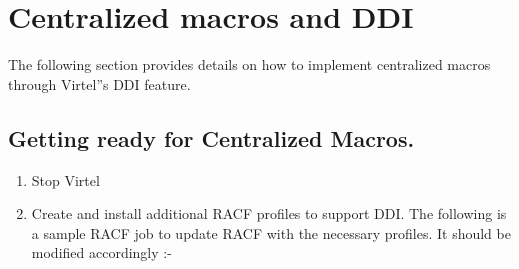 \documentclass[letterpaper,10pt,english]{sphinxmanual}
\begin{document}
\begin{sphinxVerbatim}[commandchars=\\\{\}]

  
          
   
\end{sphinxVerbatim}


\chapter{Centralized macros and DDI}
\label{\detokenize{TN202002:centralized-macros-and-ddi}}
The following section provides details on how to implement centralized macros through Virtel”s DDI feature.


\section{Getting ready for Centralized Macros.}
\label{\detokenize{TN202002:getting-ready-for-centralized-macros}}\begin{enumerate}
\def\theenumi{\arabic{enumi}}
\def\labelenumi{\theenumi .}
\makeatletter\def\p@enumii{\p@enumi \theenumi .}\makeatother
\item {} 
Stop Virtel

\item {} 
Create and install additional RACF profiles to support DDI. The following is a sample RACF job to update RACF with the necessary profiles. It should be modified accordingly :-

\end{enumerate}
\end{document}
